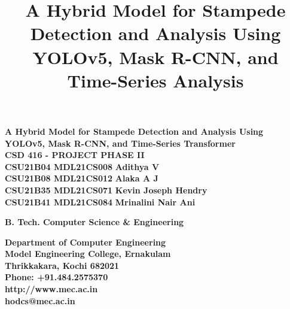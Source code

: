 \documentclass[11pt]{report}
\newcommand{\truncate}[2]{%
  \IfSubstr{#1}{\detokenize{}}{#1}{%
    \StrLeft{#1}{#2}...
  }%
}
\begin{document}
	\renewcommand\bibname{References}
	\pagestyle{fancy}
	\fancyhead{}
	\fancyfoot{}
	\fancyfoot[c]{\thepage}
	\renewcommand{\chaptermark}[1]{
		\markboth{\thechapter.\ #1}{}}
	\renewcommand{\headrulewidth}{0.1pt}
	\fancyhead[r]{\slshape \leftmark}
	\addtolength{\headheight}{\baselineskip}

	\lhead{\nouppercase{\rightmark}}
	\rhead{\nouppercase{\leftmark}}
	\fancyhead[LO,RE]{\slshape \leftmark}

	
	\title {A Hybrid Model for Stampede Detection and Analysis Using YOLOv5, Mask R-CNN, and Time-Series Analysis}

	\begin{titlepage}
		\begin{center}
                \vspace{0.2in}
			\Huge{\textbf{A Hybrid Model for Stampede Detection and Analysis Using YOLOv5, Mask R-CNN, and Time-Series Transformer}}\\
			\large{\textbf{CSD 416 - PROJECT PHASE II\\}}
			\vspace{0.5in}
			\Large{\textbf{CSU21B04 MDL21CS008
			}}	\hspace{.1in}	\Large{\textbf{Adithya V}}\\
			\Large{\textbf{CSU21B08 MDL21CS012
			}}	\hspace{.1in}	\Large{\textbf{Alaka A J}}\\
			\Large{\textbf{CSU21B35 MDL21CS071
			}}	\hspace{.1in}	\Large{\textbf{Kevin Joseph Hendry}}\\
             \Large{\textbf{CSU21B41 MDL21CS084
			}}	\hspace{.1in}	\Large{\textbf{Mrinalini Nair Ani}}
		      \vspace{1cm}
    
			\Large{\textbf{
					B. Tech. Computer Science \& Engineering
			}}

			\vspace{.4in}
			\begin{figure}[h]
				\begin{center}
				\end{center}
			\end{figure}
			\textbf{
				Department of Computer Engineering\\
				Model Engineering College, Ernakulam\\
				Thrikkakara, Kochi 682021\\
				Phone: +91.484.2575370\\
				http://www.mec.ac.in \\
				hodcs@mec.ac.in
			}
           \vspace{1.5cm}


\end{center}
\end{titlepage}
\end{document}
